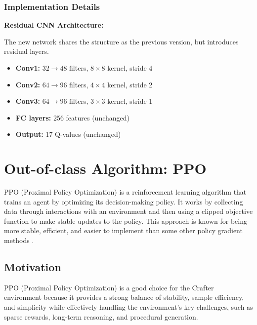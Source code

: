 \documentclass[twocolumn]{article}
\begin{document}
\subsubsection*{Implementation Details}

\textbf{Residual CNN Architecture:}

The new network shares the structure as the previous version, but introduces residual layers.

\begin{itemize}
	\item \textbf{Conv1:} $32 \rightarrow 48$ filters, $8 \times 8$ kernel, stride 4
	\item \textbf{Conv2:} $64 \rightarrow 96$ filters, $4 \times 4$ kernel, stride 2  
	\item \textbf{Conv3:} $64 \rightarrow 96$ filters, $3 \times 3$ kernel, stride 1
	\item \textbf{FC layers:} 256 features (unchanged)
	\item \textbf{Output:} 17 Q-values (unchanged)
\end{itemize}


\section*{Out-of-class Algorithm: PPO}

PPO (Proximal Policy Optimization) is a reinforcement learning algorithm that trains an agent by optimizing its decision-making policy. It works by collecting data through interactions with an environment and then using a clipped objective function to make stable updates to the policy. This approach is known for being more stable, efficient, and easier to implement than some other policy gradient methods \parencite{schulman}.

\subsection*{Motivation}
PPO (Proximal Policy Optimization) is a good choice for the Crafter environment because it provides a strong balance of stability, sample efficiency, and simplicity while effectively handling the environment's key challenges, such as sparse rewards, long-term reasoning, and procedural generation. 
\end{document}
